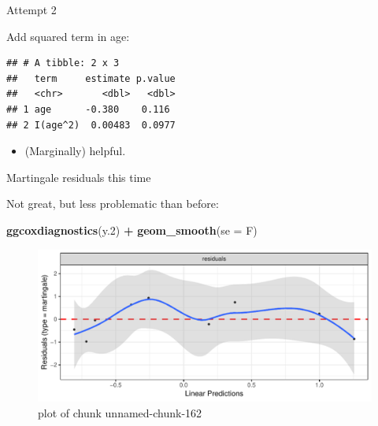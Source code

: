 \documentclass[ignorenonframetext,]{beamer}
\newenvironment{Shaded}{\begin{snugshade}}{\end{snugshade}}
\newcommand{\DataTypeTok}[1]{\textcolor[rgb]{0.13,0.29,0.53}{#1}}
\newcommand{\DecValTok}[1]{\textcolor[rgb]{0.00,0.00,0.81}{#1}}
\newcommand{\FloatTok}[1]{\textcolor[rgb]{0.00,0.00,0.81}{#1}}
\newcommand{\KeywordTok}[1]{\textcolor[rgb]{0.13,0.29,0.53}{\textbf{#1}}}
\newcommand{\NormalTok}[1]{#1}
\newcommand{\OperatorTok}[1]{\textcolor[rgb]{0.81,0.36,0.00}{\textbf{#1}}}
\newcommand{\StringTok}[1]{\textcolor[rgb]{0.31,0.60,0.02}{#1}}
\providecommand{\tightlist}{%
  \setlength{\itemsep}{0pt}\setlength{\parskip}{0pt}}
\begin{document}
\begin{frame}[fragile]{Attempt 2}
\protect\hypertarget{attempt-2}{}

Add squared term in age:

\begin{Shaded}
\end{Shaded}

\begin{verbatim}
## # A tibble: 2 x 3
##   term     estimate p.value
##   <chr>       <dbl>   <dbl>
## 1 age      -0.380    0.116 
## 2 I(age^2)  0.00483  0.0977
\end{verbatim}

\begin{itemize}
\tightlist
\item
  (Marginally) helpful.
\end{itemize}

\end{frame}

\begin{frame}[fragile]{Martingale residuals this time}
\protect\hypertarget{martingale-residuals-this-time}{}

Not great, but less problematic than before:

\begin{Shaded}
\begin{Highlighting}[]
\KeywordTok{ggcoxdiagnostics}\NormalTok{(y}\FloatTok{.2}\NormalTok{) }\OperatorTok{+}\StringTok{ }\KeywordTok{geom_smooth}\NormalTok{(}\DataTypeTok{se =}\NormalTok{ F)}
\end{Highlighting}
\end{Shaded}

\begin{figure}
\centering
\includegraphics{figure/unnamed-chunk-162-1.pdf}
\caption{plot of chunk unnamed-chunk-162}
\end{figure}

\end{frame}
\end{document}
